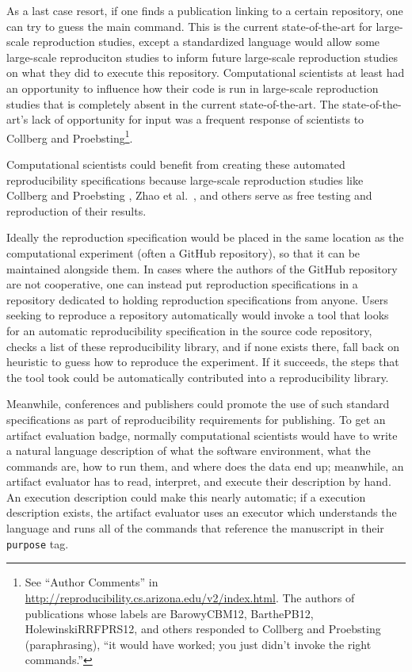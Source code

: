 \documentclass[manuscript,authordraft]{acmart}
\begin{document}
As a last case resort, if one finds a publication linking to a certain
repository, one can try to guess the main command. This is the current
state-of-the-art for large-scale reproduction studies, except a
standardized language would allow some large-scale reproduciton studies
to inform future large-scale reproduction studies on what they did to
execute this repository. Computational scientists at least had an
opportunity to influence how their code is run in large-scale
reproduction studies that is completely absent in the current
state-of-the-art. The state-of-the-art's lack of opportunity for input
was a frequent response of scientists to Collberg and
Proebsting\footnote{See ``Author Comments'' in
  \url{http://reproducibility.cs.arizona.edu/v2/index.html}. The authors
  of publications whose labels are BarowyCBM12, BarthePB12,
  HolewinskiRRFPRS12, and others responded to Collberg and Proebsting
  (paraphrasing), ``it would have worked; you just didn't invoke the
  right commands.''}.

Computational scientists could benefit from creating these automated
reproducibility specifications because large-scale reproduction studies
like Collberg and Proebsting \cite{collberg_repeatability_2016}, Zhao et
al.~\cite{zhao_why_2012}, and others serve as free testing and
reproduction of their results.

Ideally the reproduction specification would be placed in the same
location as the computational experiment (often a GitHub repository), so
that it can be maintained alongside them. In cases where the authors of
the GitHub repository are not cooperative, one can instead put
reproduction specifications in a repository dedicated to holding
reproduction specifications from anyone. Users seeking to reproduce a
repository automatically would invoke a tool that looks for an automatic
reproducibility specification in the source code repository, checks a
list of these reproducibility library, and if none exists there, fall
back on heuristic to guess how to reproduce the experiment. If it
succeeds, the steps that the tool took could be automatically
contributed into a reproducibility library.

Meanwhile, conferences and publishers could promote the use of such
standard specifications as part of reproducibility requirements for
publishing. To get an artifact evaluation badge, normally computational
scientists would have to write a natural language description of what
the software environment, what the commands are, how to run them, and
where does the data end up; meanwhile, an artifact evaluator has to
read, interpret, and execute their description by hand. An execution
description could make this nearly automatic; if a execution description
exists, the artifact evaluator uses an executor which understands the
language and runs all of the commands that reference the manuscript in
their \texttt{purpose} tag.
\end{document}

